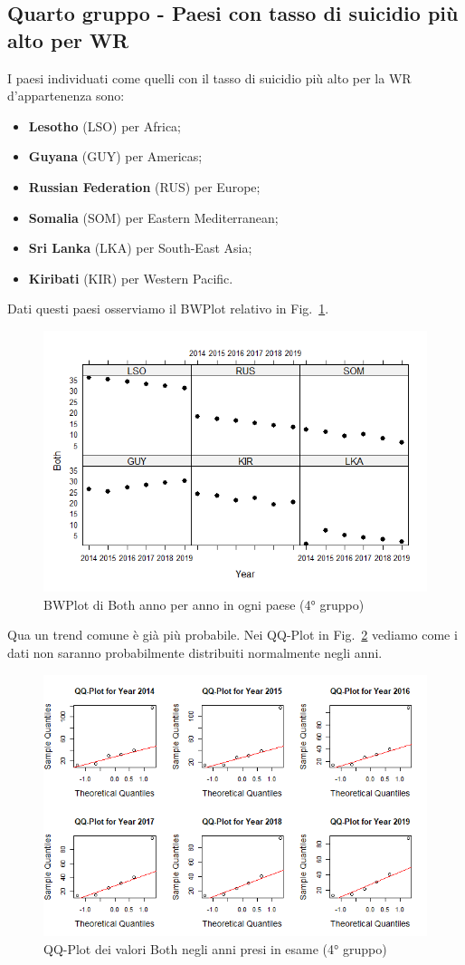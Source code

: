 \documentclass[conference]{IEEEtran}
\begin{document}
\subsection{Quarto gruppo - Paesi con tasso di suicidio più alto per WR}

I paesi individuati come quelli con il tasso di suicidio più alto per la
WR d'appartenenza sono:
\begin{itemize}
    \item \textbf{Lesotho} (LSO) per Africa;
    \item \textbf{Guyana} (GUY) per Americas;
    \item \textbf{Russian Federation} (RUS) per Europe;
    \item \textbf{Somalia} (SOM) per Eastern Mediterranean;
    \item \textbf{Sri Lanka} (LKA) per South-East Asia;
    \item \textbf{Kiribati} (KIR) per Western Pacific. 
\end{itemize}
Dati questi paesi osserviamo il BWPlot relativo in Fig.~\ref{11fourthgroup}.
\begin{figure}[htbp]
    \centerline{\includegraphics[width=.5\textwidth]{img/11 - Fourthgroup.png}}
    \caption{BWPlot di Both anno per anno in ogni paese (4° gruppo)}
    \label{11fourthgroup}
\end{figure}
Qua un trend comune è già più probabile.
Nei QQ-Plot in Fig.~\ref{12fourthqq} vediamo come i dati non saranno
probabilmente distribuiti normalmente negli anni.
\begin{figure}[htbp]
    \centerline{\includegraphics[width=.5\textwidth]{img/12 - Fourthqq.png}}
    \caption{QQ-Plot dei valori Both negli anni presi in esame (4° gruppo)}
    \label{12fourthqq}
\end{figure}
\end{document}
